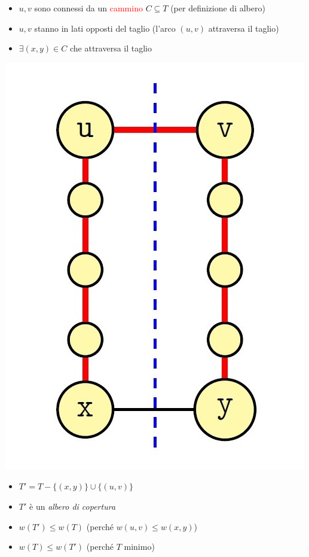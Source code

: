 \documentclass[../cheatSheetAlgoritmi.tex]{subfiles}
\begin{document}
\hfill
\begin{minipage}{0.6\textwidth}\raggedleft
\begin{itemize}
	\item $u, v$ sono connessi da un \textcolor{red}{cammino} $C \subseteq T$ (per definizione di albero)
	\item $u, v$ stanno in lati opposti del taglio (l'arco $(u, v)$ attraversa il taglio)
	\item $\exists (x, y) \in C$ che attraversa il taglio
\end{itemize}
\end{minipage}
\noindent\begin{minipage}{0.3\textwidth}
\includegraphics[width=\linewidth]{../img/Greedy_6.jpg}
\end{minipage}
\hfill
\begin{minipage}{0.6\textwidth}\raggedleft
\begin{itemize}
	\item $T' = T - \{(x, y)\} \cup \{(u, v)\}$
	\item $T'$ è un \emph{albero di copertura}
	\item $w(T') \leq w(T)$ (perché $w(u, v) \leq w(x, y)$)
	\item $w(T) \leq w(T')$ (perché $T$ minimo)
\end{itemize}
\end{minipage} \\\\
\end{document}

